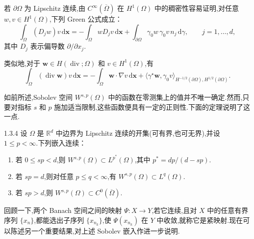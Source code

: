 若 \(\partial\Omega\) 为 Lipschitz 连续,由 \(C^\infty(\overline\Omega)\) 在 \(H^1(\Omega)\) 中的稠密性容易证明,对任意 \(w,v\in H^1(\Omega)\),下列 Green 公式成立：
\begin{equation}\label{eq:1.3.3}
  \int_\Omega (D_jw)v\,\mathrm d\boldsymbol{x}
  =-\int_\Omega wD_jv\,\mathrm d\boldsymbol{x}
   +\int_{\partial\Omega}\gamma_0w\,\gamma_0v\,n_j\,\mathrm d\gamma,
  \qquad j=1,\ldots,d,
\end{equation}
其中 \(D_j\) 表示偏导数 \(\partial/\partial x_j\).

类似地,对于 \(\boldsymbol{w}\in H(\operatorname{div};\Omega)\) 和 \(v\in H^1(\Omega)\),有
\begin{equation}\label{eq:1.3.4}
  \int_\Omega(\operatorname{div}\boldsymbol{w})v\,\mathrm d\boldsymbol{x}
  =-\int_\Omega\boldsymbol{w}\cdot\nabla v\,\mathrm d\boldsymbol{x}
   +\langle\gamma^\star\boldsymbol{w},\gamma_0v\rangle_{H^{-1/2}(\partial\Omega),H^{1/2}(\partial\Omega)}.
\end{equation}

如前所述,Sobolev 空间 \(W^{s,p}(\Omega)\) 中的函数在零测集上的值并不唯一确定.然而,只要对指标 \(s\) 和 \(p\) 施加适当限制,这些函数便具有一定的正则性.下面的定理说明了这一点.

\begin{theorem}{1.3.4}
设 \(\Omega\) 是 \(\mathbb R^d\) 中边界为 Lipschitz 连续的开集(可有界,也可无界),并设 \(1\le p<\infty\).下列嵌入连续：
\begin{enumerate}[label=\alph*.,leftmargin=*]
  \item 若 \(0\le sp<d\),则 \(W^{s,p}(\Omega)\subset L^{p^*}(\Omega)\),其中 \(p^*=dp/(d-sp)\).
  \item 若 \(sp=d\),则对任意 \(p\le q<\infty\),有 \(W^{s,p}(\Omega)\subset L^q(\Omega)\).
  \item {}若 \(sp>d\),则 \(W^{s,p}(\Omega)\subset C^0(\overline\Omega)\).
\end{enumerate}
\end{theorem}

回顾一下,两个 Banach 空间之间的映射 \(\Psi\colon X\to Y\),若它连续,且对 \(X\) 中的任意有界序列 \(\{x_n\}\),都能选出子序列 \(\{x_{n_k}\}\),使 \(\Psi(x_{n_k})\) 在 \(Y\) 中收敛,就称它是紧映射.现在可以陈述另一个重要结果,对上述 Sobolev 嵌入作进一步说明.

